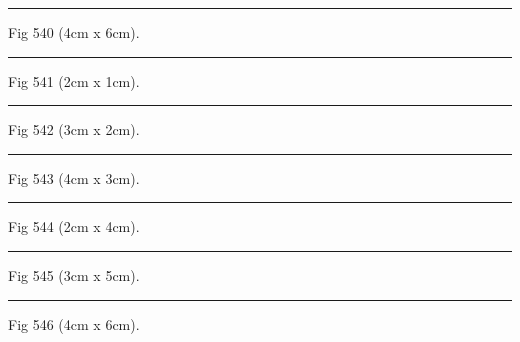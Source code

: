 \documentclass[a4paper,11pt]{article}
\begin{document}
\begin{swarmwrap}%
  \begin{minipage}[t]{4cm}
    \centering
    \rule{\linewidth}{6cm}
    {\footnotesize Fig 540 (4cm x 6cm).}
  \end{minipage}%
\end{swarmwrap}%
\swarmwrapnext
\lipsum[90]%

\begin{swarmwrap}%
  \begin{minipage}[t]{2cm}
    \centering
    \rule{\linewidth}{1cm}
    {\footnotesize Fig 541 (2cm x 1cm).}
  \end{minipage}%
\end{swarmwrap}%
\swarmwrapnext
\lipsum[91]%

\begin{swarmwrap}%
  \begin{minipage}[t]{3cm}
    \centering
    \rule{\linewidth}{2cm}
    {\footnotesize Fig 542 (3cm x 2cm).}
  \end{minipage}%
\end{swarmwrap}%
\swarmwrapnext
\lipsum[92]%

\begin{swarmwrap}%
  \begin{minipage}[t]{4cm}
    \centering
    \rule{\linewidth}{3cm}
    {\footnotesize Fig 543 (4cm x 3cm).}
  \end{minipage}%
\end{swarmwrap}%
\swarmwrapnext
\lipsum[93]%

\begin{swarmwrap}%
  \begin{minipage}[t]{2cm}
    \centering
    \rule{\linewidth}{4cm}
    {\footnotesize Fig 544 (2cm x 4cm).}
  \end{minipage}%
\end{swarmwrap}%
\swarmwrapnext
\lipsum[94]%

\begin{swarmwrap}%
  \begin{minipage}[t]{3cm}
    \centering
    \rule{\linewidth}{5cm}
    {\footnotesize Fig 545 (3cm x 5cm).}
  \end{minipage}%
\end{swarmwrap}%
\swarmwrapnext
\lipsum[95]%

\begin{swarmwrap}%
  \begin{minipage}[t]{4cm}
    \centering
    \rule{\linewidth}{6cm}
    {\footnotesize Fig 546 (4cm x 6cm).}
  \end{minipage}%
\end{swarmwrap}%
\swarmwrapnext
\lipsum[96]%
\end{document}
